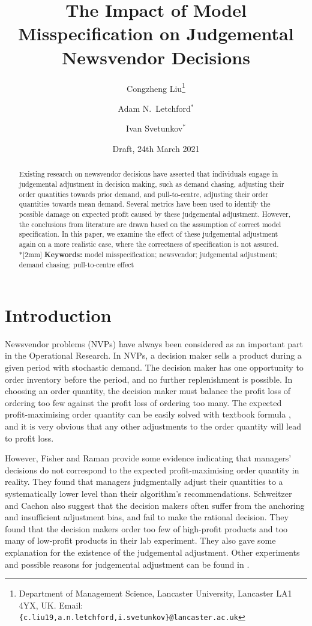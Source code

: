\documentclass[a4paper,11pt]{article}
\title{The Impact of Model Misspecification on Judgemental Newsvendor Decisions}
\author{Congzheng Liu\thanks{Department of Management Science,
Lancaster University, Lancaster LA1 4YX, UK.
Email: {\tt \{c.liu19,a.n.letchford,i.svetunkov\}@lancaster.ac.uk}}
\and Adam N.\ Letchford$^*$ \and Ivan Svetunkov$^*$} %
\date{Draft, 24th March 2021}
\begin{document}
\maketitle

\begin{abstract}
Existing research on newsvendor decisions have asserted that individuals engage in judgemental adjustment in decision making, such as demand chasing, adjusting their order quantities towards prior demand, and pull-to-centre, adjusting their order quantities towards mean demand. Several metrics have been used to identify the possible damage on expected profit caused by these judgemental adjustment. However, the conclusions from literature are drawn based on the assumption of correct model specification. In this paper, we examine the effect of these judgemental adjustment again on a more realistic case, where the correctness of specification is not assured. 
\\*[2mm]
{\bf Keywords:} model misspecification; newsvendor; judgemental adjustment; demand chasing; pull-to-centre effect
\end{abstract}


\section{Introduction}
Newsvendor problems (NVPs) have always been considered as an important part in the Operational Research.
In NVPs, a decision maker sells a product during a given period with stochastic demand.
The decision maker has one opportunity to order inventory before the period, and no further replenishment is possible. In choosing an order quantity, the
decision maker must balance the profit loss of ordering too few against the profit loss of ordering too many. The expected profit-maximising order quantity can be easily solved with textbook formula \cite{AHM51}, and it is very obvious that any other adjustments to the order quantity will lead to profit loss.

However, Fisher and Raman \cite{FR96} provide some evidence indicating that managers’ decisions do not correspond to the expected profit-maximising order quantity in reality. They found that managers judgmentally adjust their quantities to a systematically lower level than their algorithm’s recommendations. Schweitzer and Cachon \cite{SC00} also suggest that the decision makers often suffer from the anchoring and insufficient adjustment bias, and fail to make the rational decision. They found that the decision makers order too few of high-profit products and too many of low-profit products in their lab experiment. They also gave some explanation for the existence of the judgemental adjustment. Other experiments and possible reasons for judgemental adjustment can be found in \cite{S08,CLP15,FKZ11}.
\end{document}
